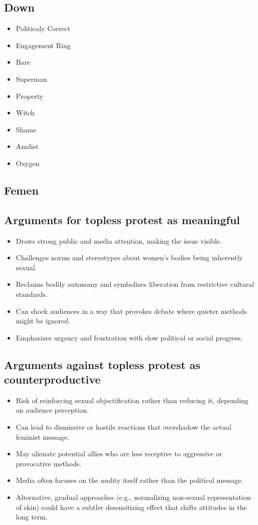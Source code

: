 \documentclass[11pt,a4paper,oneside]{article}
\begin{document}
	\subsection*{Down}
	\begin{itemize}
		\item Politicaly Correct 
		\item Engagement Ring 
		\item Bare
		\item Superman 
		\item Property 
		\item Witch 
		\item Shame 
		\item Amdist 
		\item Oxygen 
	\end{itemize}
	\newpage
	
	
	\subsection*{Femen}
	\subsection*{Arguments for topless protest as meaningful}
	\begin{itemize}[leftmargin=*]
		\item Draws strong public and media attention, making the issue visible.  
		\item Challenges norms and stereotypes about women’s bodies being inherently sexual.  
		\item Reclaims bodily autonomy and symbolizes liberation from restrictive cultural standards.  
		\item Can shock audiences in a way that provokes debate where quieter methods might be ignored.  
		\item Emphasizes urgency and frustration with slow political or social progress.  
	\end{itemize}
	
	\subsection*{Arguments against topless protest as counterproductive}
	\begin{itemize}[leftmargin=*]
		\item Risk of reinforcing sexual objectification rather than reducing it, depending on audience perception.  
		\item Can lead to dismissive or hostile reactions that overshadow the actual feminist message.  
		\item May alienate potential allies who are less receptive to aggressive or provocative methods.  
		\item Media often focuses on the nudity itself rather than the political message.  
		\item Alternative, gradual approaches (e.g., normalizing non-sexual representation of skin) could have a subtler desensitizing effect that shifts attitudes in the long term.  
	\end{itemize}
	
\end{document}
